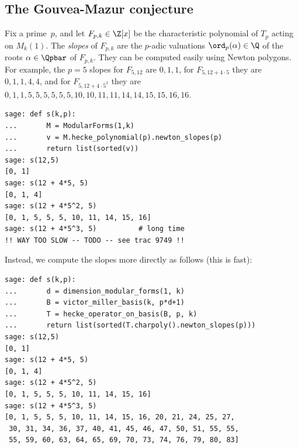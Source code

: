 \documentclass{report}
\begin{document}


\subsection{The Gouvea-Mazur conjecture}
Fix a prime~$p$, and let $F_{p,k}\in\Z[x]$ be the characteristic
polynomial of $T_p$ acting on $M_k(1)$.  The {\em slopes} of
$F_{p,k}$ are the $p$-adic valuations $\ord_p(\alpha)\in\Q$ of the
roots $\alpha\in\Qpbar$ of $F_{p,k}$. They can be computed easily
using Newton polygons.
For example, the $p=5$ slopes for
$F_{5,12}$ are $0,1,1$, for $F_{5,12+4\cdot 5}$ they are
$0,1,1,4,4$, and for $F_{5,12+4\cdot 5^2}$ they are $
 0, 1, 1, 5, 5, 5, 5, 5, 5, 10, 10, 11, 11, 14, 14, 15, 15, 16,
16.
$

\begin{lstlisting}
sage: def s(k,p):
...       M = ModularForms(1,k)
...       v = M.hecke_polynomial(p).newton_slopes(p)
...       return list(sorted(v))
sage: s(12,5)
[0, 1]
sage: s(12 + 4*5, 5)
[0, 1, 4]
sage: s(12 + 4*5^2, 5)
[0, 1, 5, 5, 5, 10, 11, 14, 15, 16]
sage: s(12 + 4*5^3, 5)          # long time
!! WAY TOO SLOW -- TODO -- see trac 9749 !!
\end{lstlisting}

Instead, we compute the slopes more directly as follows (this is fast):

\begin{lstlisting}
sage: def s(k,p):
...       d = dimension_modular_forms(1, k)
...       B = victor_miller_basis(k, p*d+1)
...       T = hecke_operator_on_basis(B, p, k)
...       return list(sorted(T.charpoly().newton_slopes(p)))
sage: s(12,5)
[0, 1]
sage: s(12 + 4*5, 5)
[0, 1, 4]
sage: s(12 + 4*5^2, 5)
[0, 1, 5, 5, 5, 10, 11, 14, 15, 16]
sage: s(12 + 4*5^3, 5)
[0, 1, 5, 5, 5, 10, 11, 14, 15, 16, 20, 21, 24, 25, 27,
 30, 31, 34, 36, 37, 40, 41, 45, 46, 47, 50, 51, 55, 55,
 55, 59, 60, 63, 64, 65, 69, 70, 73, 74, 76, 79, 80, 83]
\end{lstlisting}
\end{document}
